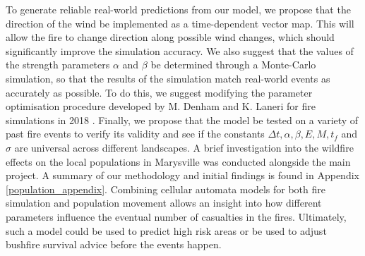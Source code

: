 To generate reliable real-world predictions from our model, we propose that the direction of the wind be implemented as a time-dependent vector map. This will allow the fire to change direction along possible wind changes, which should significantly improve the simulation accuracy. We also suggest that the values of the strength parameters $\alpha$ and $\beta$ be determined through a Monte-Carlo simulation, so that the results of the simulation match real-world events as accurately as possible. To do this, we suggest modifying the parameter optimisation procedure developed by M. Denham and K. Laneri for fire simulations in 2018 \cite{Denham_2018}. Finally, we propose that the model be tested on a variety of past fire events to verify its validity and see if the constants $\Delta t,\alpha,\beta,E,M,t_f$ and $\sigma$ are universal across different landscapes. \newline \indent A brief investigation into the wildfire effects on the local populations in Marysville was conducted alongside the main project. A summary of our methodology and initial findings is found in Appendix \ref{population_appendix}. Combining cellular automata models for both fire simulation and population movement allows an insight into how different parameters influence the eventual number of casualties in the fires. Ultimately, such a model could be used to predict high risk areas or be used to adjust bushfire survival advice before the events happen.